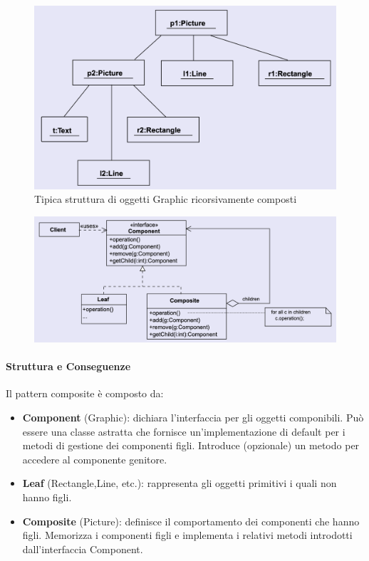 \begin{figure}[H]
    \centering
    \includegraphics[width=0.5\linewidth]{assets/pattern/composite/composite-object.png}
    \caption{Tipica struttura di oggetti Graphic ricorsivamente composti}
\end{figure}

\newpage

\begin{figure}[H]
    \centering
    \includegraphics[width=1\linewidth]{assets/pattern/composite/composite-struttura.png}
\end{figure}

\paragraph{Struttura e Conseguenze} Il pattern composite è composto da:
\begin{itemize}
    \item \textbf{Component} (Graphic): dichiara l’interfaccia per gli oggetti componibili. Può essere una classe astratta che fornisce un’implementazione di default per i metodi di gestione dei componenti figli. Introduce (opzionale) un metodo per accedere al componente genitore. 
    \item \textbf{Leaf} (Rectangle,Line, etc.): rappresenta gli oggetti primitivi i quali non hanno figli. 
    \item \textbf{Composite} (Picture): definisce il comportamento dei componenti che hanno figli. Memorizza i componenti figli e implementa i relativi metodi introdotti dall’interfaccia Component.
\end{itemize}

